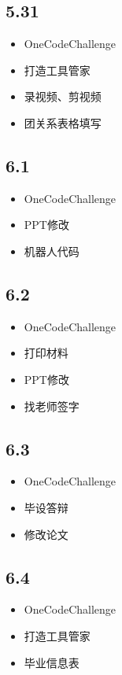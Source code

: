 \documentclass[UTF8]{ctexart}
\begin{document}
\subsection*{5.31}
\begin{itemize}
    \item OneCodeChallenge
    \item 打造工具管家
    \item 录视频、剪视频
    \item 团关系表格填写
\end{itemize}

\subsection*{6.1}
\begin{itemize}
    \item OneCodeChallenge
    \item PPT修改
    \item 机器人代码
\end{itemize}

\subsection*{6.2}
\begin{itemize}
    \item OneCodeChallenge
    \item 打印材料
    \item PPT修改
    \item 找老师签字
\end{itemize}

\subsection*{6.3}
\begin{itemize}
    \item OneCodeChallenge
    \item 毕设答辩
    \item 修改论文
\end{itemize}

\subsection*{6.4}
\begin{itemize}
    \item OneCodeChallenge
    \item 打造工具管家
    \item 毕业信息表
\end{itemize}
\end{document}
